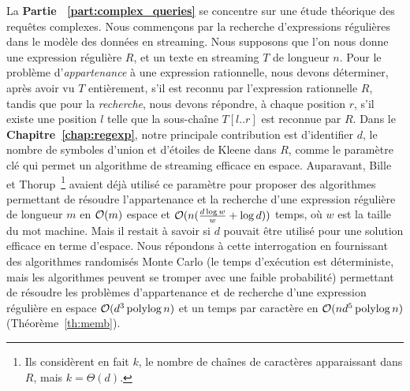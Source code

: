 La \textbf{Partie ~\ref{part:complex_queries}} se concentre sur une étude théorique des requêtes complexes.
Nous commençons par la recherche d'expressions régulières dans le modèle des données en streaming.
%
Nous supposons que l'on nous donne une expression régulière $R$, et un texte en streaming $T$ de longueur $n$. Pour le problème d'\emph{appartenance} à une expression rationnelle, nous devons déterminer, après avoir vu $T$ entièrement, s'il est reconnu par l'expression rationnelle $R$, tandis que pour la \emph{recherche}, nous devons répondre, à chaque position $r$, s'il existe une position $l$ telle que la sous-chaîne $T[l..r]$ est reconnue par $R$.
Dans le \textbf{Chapitre~\ref{chap:regexp}}, notre principale contribution est d'identifier $d$, le nombre de symboles d'union et d'étoiles de Kleene dans $R$, comme le paramètre clé qui permet un algorithme de streaming efficace en espace. 
Auparavant, Bille et Thorup~\cite{doi:10.1137/1.9781611973075.104}\footnote{Ils considèrent en fait $k$, le nombre de chaînes de caractères apparaissant dans $R$, mais $k=\Theta(d)$. } avaient déjà utilisé ce paramètre pour proposer des algorithmes permettant de résoudre l'appartenance et la recherche d'une expression régulière de longueur $m$ en $\mathcal{O}(m)$ espace et $\mathcal{O}(n(\frac{d\log w}{w} + \log d))$ temps, où $w$ est la taille du mot machine. Mais il restait à savoir si $d$ pouvait être utilisé pour une solution efficace en terme d'espace.
%
Nous répondons à cette interrogation en fournissant des algorithmes randomisés Monte Carlo (le temps d'exécution est déterministe, mais les algorithmes peuvent se tromper avec une faible probabilité) permettant de résoudre les problèmes d'appartenance et de recherche d'une expression régulière en espace $\mathcal{O}(d^3\operatorname{polylog} n)$ et un temps par caractère en $\mathcal{O}(nd^5\operatorname{polylog} n)$ (Théorème~\ref{th:memb}).

